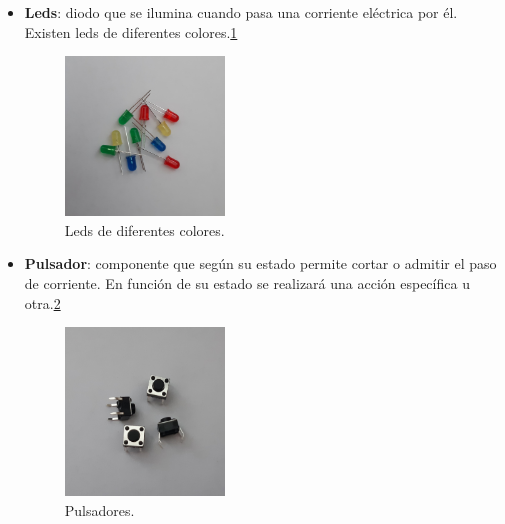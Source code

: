 \begin{itemize}
\item \textbf{Leds}: diodo que se ilumina cuando pasa una corriente eléctrica por él. Existen leds de diferentes colores.\ref{fig:leds}
\begin{figure}[h!]
    \centering
    \includegraphics[width=0.4\textwidth]{img/imgLeds.jpg}
    \caption{Leds de diferentes colores.}
    \label{fig:leds} %
\end{figure}

\item \textbf{Pulsador}: componente que según su estado permite cortar o admitir el paso de corriente. En función de su estado se realizará una acción específica u otra.\ref{fig:pulsador}
\begin{figure}[h!]
    \centering
    \includegraphics[width=0.4\textwidth]{img/imgPulsador.jpg}
    \caption{Pulsadores.}
    \label{fig:pulsador} %
\end{figure}


\end{itemize}
